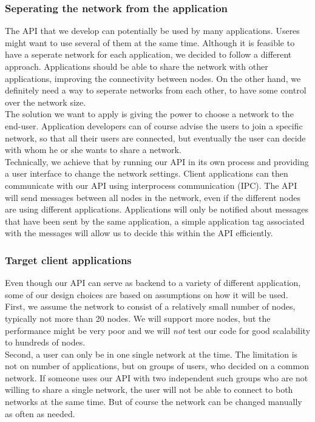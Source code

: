 \subsubsection{Seperating the network from the application}
The API that we develop can potentially be used by many applications. Useres might want to use several of them at the same time. Although it is feasible to have a seperate network for each application, we decided to follow a different approach. Applications should be able to share the network with other applications, improving the connectivity between nodes. On the other hand, we definitely need a way to seperate networks from each other, to have some control over the network size. \\
The solution we want to apply is giving the power to choose a network to the end-user. Application developers can of course advise the users to join a specific network, so that all their users are connected, but eventually the user can decide with whom he or she wants to share a network. \\
Technically, we achieve that by running our API in its own process and providing a user interface to change the network settings. Client applications can then communicate with our API using interprocess communication (IPC). The API will send messages between all nodes in the network, even if the different nodes are using different applications. Applications will only be notified about messages that have been sent by the same application, a simple application tag associated with the messages will allow us to decide this within the API efficiently. \\

\subsubsection{Target client applications}
	Even though our API can serve as backend to a variety of different application, some of our design choices are based on assumptions on how it will be used. \\
	First, we assume the network to consist of a relatively small number of nodes, typically not more than 20 nodes. We will support more nodes, but the performance might be very poor and we will \textit{not} test our code for good scalability to hundreds of nodes. \\
Second, a user can only be in one single network at the time. The limitation is not on number of applications, but on groups of users, who decided on a common network. If someone uses our API with two independent such groups who are not willing to share a single network, the user will not be able to connect to both networks at the same time. But of course the network can be changed manually as often as needed.

